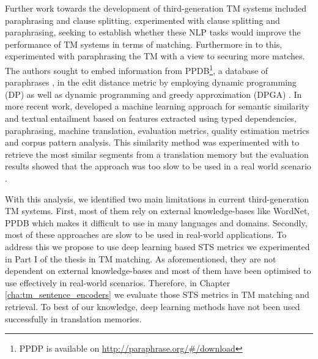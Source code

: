 Further work towards the development of third-generation TM systems included paraphrasing and clause splitting. \citet{raisa-timonera-mitkov-2015-improving} experimented with clause splitting and paraphrasing, seeking to establish whether these NLP tasks would improve the performance of TM systems in terms of matching. Furthermore in to this, \citet{Gupta2016} experimented with paraphrasing the TM with a view to securing more matches. The authors sought to embed information from PPDB\footnote{PPDP is available on \url{http://paraphrase.org/\#/download}}, a database of paraphrases \cite{ganitkevitch-etal-2013-ppdb}, in the edit distance metric by employing dynamic programming (DP) \cite{Gupta2016}  as well as dynamic programming and greedy approximation (DPGA) \cite{10.1007/978-3-319-45510-5_30}. In more recent work, \citet{gupta-etal-2014-uow} developed a machine learning approach for semantic similarity and textual entailment based on features extracted using typed dependencies, paraphrasing, machine translation, evaluation metrics, quality estimation metrics and corpus pattern analysis. This similarity method was experimented with to retrieve the most similar segments from a translation memory but the evaluation results showed that the approach was too slow to be used in a real world scenario \cite{gupta2014intelligent}. 

With this analysis, we identified two main limitations in current third-generation TM systems. First, most of them rely on external knowledge-bases like WordNet, PPDB which makes it difficult to use in many languages and domains. Secondly, most of these approaches are slow to be used in real-world applications. To address this we propose to use deep learning based STS metrics we experimented in Part I of the thesis in TM matching. As aforementioned, they are not dependent on external knowledge-bases and most of them have been optimised to use effectively in real-world scenarios. Therefore, in Chapter \ref{cha:tm_sentence_encoders} we evaluate those STS metrics in TM matching and retrieval. To best of our knowledge, deep learning methods have not been used successfully in translation memories. 


